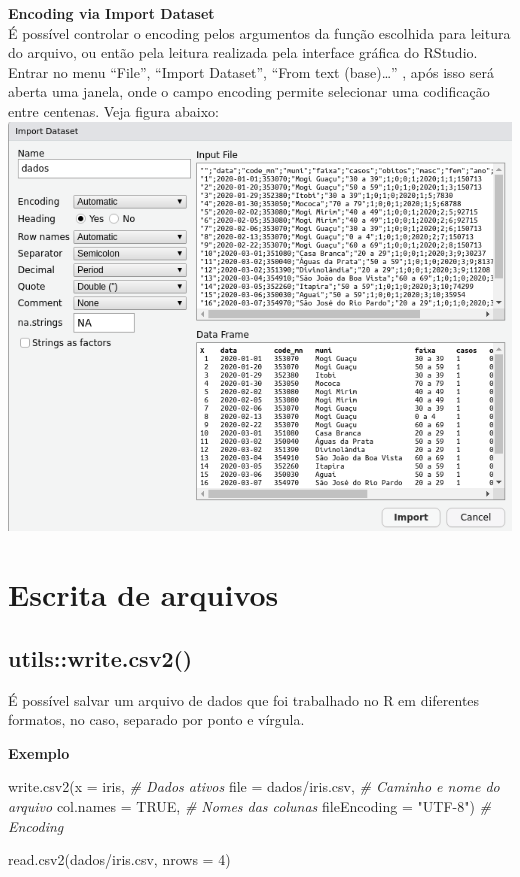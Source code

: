 \documentclass[
]{book}
\newenvironment{Shaded}{\begin{snugshade}}{\end{snugshade}}
\newcommand{\AttributeTok}[1]{\textcolor[rgb]{0.77,0.63,0.00}{#1}}
\newcommand{\CommentTok}[1]{\textcolor[rgb]{0.56,0.35,0.01}{\textit{#1}}}
\newcommand{\ConstantTok}[1]{\textcolor[rgb]{0.00,0.00,0.00}{#1}}
\newcommand{\DecValTok}[1]{\textcolor[rgb]{0.00,0.00,0.81}{#1}}
\newcommand{\FunctionTok}[1]{\textcolor[rgb]{0.00,0.00,0.00}{#1}}
\newcommand{\NormalTok}[1]{#1}
\newcommand{\StringTok}[1]{\textcolor[rgb]{0.31,0.60,0.02}{#1}}
\theoremstyle{definition}
\theoremstyle{definition}
\theoremstyle{definition}
\theoremstyle{definition}
\theoremstyle{remark}
\begin{document}
\textbf{Encoding via Import Dataset}\\
É possível controlar o encoding pelos argumentos da função escolhida para leitura do arquivo, ou então pela leitura realizada pela interface gráfica do RStudio. Entrar no menu ``File'', ``Import Dataset'', ``From text (base)\ldots{}'' , após isso será aberta uma janela, onde o campo encoding permite selecionar uma codificação entre centenas. Veja figura abaixo:
\includegraphics{ilustracoes/import_dataset.png}

\hypertarget{escrita-de-arquivos}{%
\section{Escrita de arquivos}\label{escrita-de-arquivos}}

\hypertarget{utilswrite.csv2}{%
\subsection{utils::write.csv2()}\label{utilswrite.csv2}}

É possível salvar um arquivo de dados que foi trabalhado no R em diferentes formatos, no caso, separado por ponto e vírgula.

\textbf{Exemplo}

\begin{Shaded}
\begin{Highlighting}[]
\FunctionTok{write.csv2}\NormalTok{(}\AttributeTok{x =}\NormalTok{ iris,                }\CommentTok{\# Dados ativos}
           \AttributeTok{file =} \StringTok{\textquotesingle{}dados/iris.csv\textquotesingle{}}\NormalTok{, }\CommentTok{\# Caminho e nome do arquivo}
           \AttributeTok{col.names =} \ConstantTok{TRUE}\NormalTok{,        }\CommentTok{\# Nomes das colunas  }
           \AttributeTok{fileEncoding =} \StringTok{"UTF{-}8"}\NormalTok{)  }\CommentTok{\# Encoding}

\FunctionTok{read.csv2}\NormalTok{(}\StringTok{\textquotesingle{}dados/iris.csv\textquotesingle{}}\NormalTok{, }\AttributeTok{nrows =} \DecValTok{4}\NormalTok{)}
\end{Highlighting}
\end{Shaded}
\end{document}
